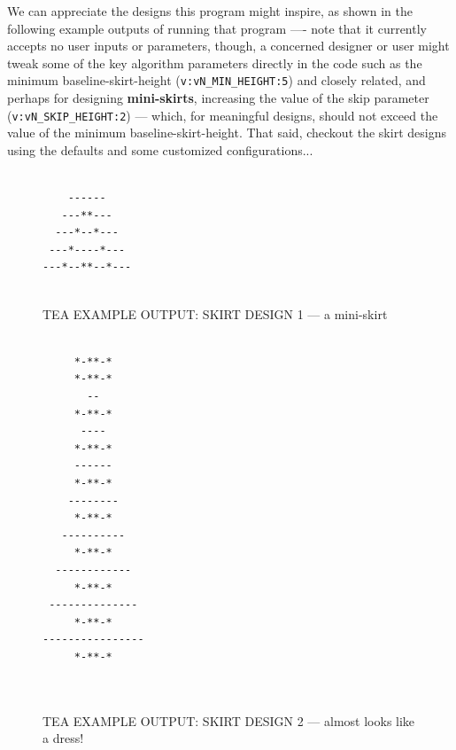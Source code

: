 \documentclass[a4paper, 18pt]{book} %
\begin{document}
We can appreciate the designs this program might inspire, as shown in the following example outputs of running that program ---- note that it currently accepts no user inputs or parameters, though, a concerned designer or user might tweak some of the key algorithm parameters directly in the code such as the minimum baseline-skirt-height (\texttt{v:vN\_MIN\_HEIGHT:{5}}) and closely related, and perhaps for designing \textbf{mini-skirts}, increasing the value of the skip parameter (\texttt{v:vN\_SKIP\_HEIGHT:{2}}) --- which, for meaningful designs, should not exceed the value of the minimum baseline-skirt-height. That said, checkout the skirt designs using the defaults and some customized configurations...


\vspace{2em}


\begin{figure}[H]
\LARGE
  \centering
  \begin{tcolorbox}[myterminalstyle, title=TEA Output from \textbf{\autoref{FIGKEX1}} --- SKIRT DESIGN GENERATOR]
  \begin{lstlisting}
 
    ------    
   ---**---   
  ---*--*---  
 ---*----*--- 
---*--**--*---
             
  \end{lstlisting}
  \end{tcolorbox}
  \caption{TEA EXAMPLE OUTPUT: SKIRT DESIGN 1 --- a mini-skirt}
\end{figure}


\begin{figure}[H]
\LARGE
  \centering
  \begin{tcolorbox}[myterminalstyle, title=TEA Output from \textbf{\autoref{FIGKEX1}} --- SKIRT DESIGN GENERATOR]
  \begin{lstlisting}
 
     *-**-*     
     *-**-*     
       --       
     *-**-*     
      ----      
     *-**-*     
     ------     
     *-**-*     
    --------    
     *-**-*     
   ----------   
     *-**-*     
  ------------  
     *-**-*     
 -------------- 
     *-**-*     
----------------
     *-**-*     
                
             
  \end{lstlisting}
  \end{tcolorbox}
  \caption{TEA EXAMPLE OUTPUT: SKIRT DESIGN 2 --- almost looks like a dress!}
\end{figure}
\end{document}
